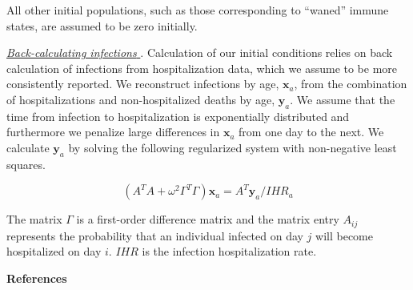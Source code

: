 \documentclass[11pt]{article}
\begin{document}
All other initial populations, such as those corresponding to “waned” immune states, are assumed to be zero initially. 

\underline{\it Back-calculating infections }. Calculation of our initial conditions relies on back calculation of infections from hospitalization data, which we assume to be more consistently reported. We reconstruct infections by age, $\mathbf{x}_a$, from the combination of hospitalizations and non-hospitalized deaths by age, $\mathbf{y}_a$. We assume that the time from infection to hospitalization is exponentially distributed and furthermore we penalize large differences in $\mathbf{x}_a$ from one day to the next. We calculate $\mathbf{y}_a$ by solving the following regularized system with non-negative least squares. 

\begin{equation}
(A^T A + \omega^2\Gamma^T \Gamma) \mathbf{x}_a = A^T \mathbf{y}_a / {IHR}_a
\end{equation}

The matrix $\Gamma$ is a first-order difference matrix and the matrix entry $A_{ij}$ represents the probability that an individual infected on day $j$ will become hospitalized on day $i$. $IHR$ is the infection hospitalization rate. 


{\bf References}
\end{document}

